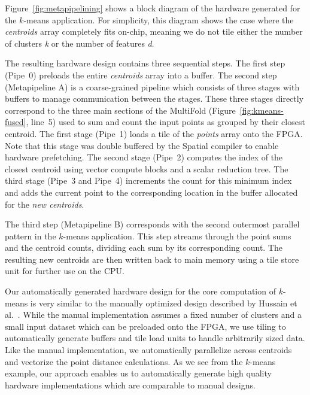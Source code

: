 Figure~\ref{fig:metapipelining} shows a block diagram of the hardware generated for the $k$-means application.
For simplicity, this diagram shows the case where the \emph{centroids} array completely fits on-chip, meaning
we do not tile either the number of clusters \emph{k} or the number of features \emph{d}.

The resulting hardware design contains three sequential steps.
The first step (Pipe~0) preloads the entire \emph{centroids} array into a buffer.
The second step (Metapipeline A) is a coarse-grained pipeline which consists of three stages with buffers to manage communication between the stages.
These three stages directly correspond to the three main sections of the MultiFold (Figure~\ref{fig:kmeans-fused}, line~5) used to sum and count the input points as grouped by their
closest centroid. The first stage (Pipe~1) loads a tile of the \emph{points} array onto the FPGA. Note that this stage was double buffered by the Spatial compiler to
enable hardware prefetching. The second stage (Pipe~2) computes the index of the closest centroid using vector compute blocks and a scalar reduction
tree. The third stage (Pipe~3 and Pipe~4) increments the count for this minimum index and adds the current point to the corresponding location in the
buffer allocated for the \emph{new centroids}.

The third step (Metapipeline B) corresponds with the second outermost parallel pattern in the $k$-means application.
This step streams through the point sums and the centroid counts, dividing each sum by its corresponding count. The resulting new centroids
are then written back to main memory using a tile store unit for further use on the CPU.

Our automatically generated hardware design for the core computation of $k$-means is very similar to the manually optimized design described by Hussain et al.~\cite{hwkmeans}.
While the manual implementation assumes a fixed number of clusters and a small input dataset which can be preloaded onto the FPGA, we use tiling to automatically generate
buffers and tile load units to handle arbitrarily sized data. Like the manual implementation, we automatically parallelize across centroids
and vectorize the point distance calculations. As we see from the $k$-means example, our approach enables us to automatically generate high quality hardware implementations which are comparable to manual designs.
